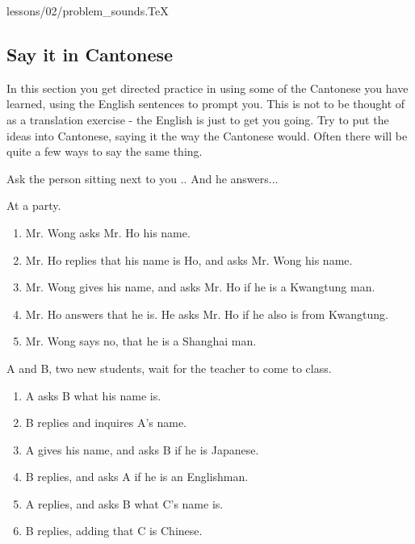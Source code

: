 lessons/02/problem_sounds.\TeX\subsection{Say it in Cantonese}

In this section you get directed practice in using some of the Cantonese you have learned, using the English sentences to prompt you. This is not to be thought of as a translation exercise - the English is just to get you going. Try to put the ideas into Cantonese, saying it the way the Cantonese would. Often there will be quite a few ways to say the same thing.

\noindent Ask the person sitting next to you .. And he answers...


\noindent At a party.

\begin{enumerate}
	\item Mr. Wong asks Mr. Ho his name.
	\item Mr. Ho replies that his name is Ho, and asks Mr. Wong his name.
	\item Mr. Wong gives his name, and asks Mr. Ho if he is a Kwangtung man.
	\item Mr. Ho answers that he is. He asks Mr. Ho if he also is from Kwangtung.
	\item Mr. Wong says no, that he is a Shanghai man.
\end{enumerate}

\noindent A and B, two new students, wait for the teacher to come to class.

\begin{enumerate}
	\item A asks B what his name is.
	\item B replies and inquires A's name.
	\item A gives his name, and asks B if he is Japanese.
	\item B replies, and asks A if he is an Englishman.
	\item A replies, and asks B what C's name is.
	\item B replies, adding that C is Chinese.
\end{enumerate}